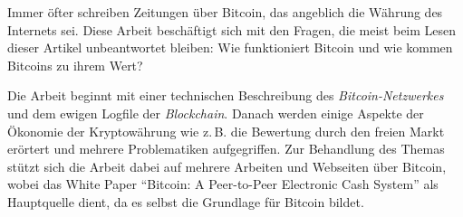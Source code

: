 Immer öfter schreiben Zeitungen über Bitcoin, das angeblich die Währung des Internets sei.
Diese Arbeit beschäftigt sich mit den Fragen, die meist beim Lesen dieser Artikel unbeantwortet bleiben:
Wie funktioniert Bitcoin und wie kommen Bitcoins zu ihrem Wert?

Die Arbeit beginnt mit einer technischen Beschreibung des \emph{Bitcoin-Netzwerkes} und dem ewigen Logfile der \emph{Blockchain}.
Danach werden einige Aspekte der Ökonomie der Kryptowährung wie z.\,B. die Bewertung durch den freien Markt erörtert und mehrere Problematiken aufgegriffen.
Zur Behandlung des Themas stützt sich die Arbeit dabei auf mehrere Arbeiten und Webseiten über Bitcoin, wobei das White Paper "`Bitcoin: A Peer-to-Peer Electronic Cash System"' als Hauptquelle dient, da es selbst die Grundlage für Bitcoin bildet.
